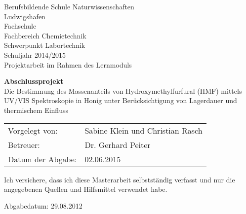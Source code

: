 \documentclass[%
11pt,                               %
liststotoc,                 %
bibtotoc,                       %
]{scrreprt}
\begin{document}
\pagestyle{empty} %
\setlength{\parindent}{0cm}

\begin{titlepage}
  \begin{center}
    \vspace*{2cm}
      \Large{Berufsbildende Schule Naturwissenschaften}\\
      \smallskip
      \Large{Ludwigshafen}\\
      \smallskip
      \Large{Fachschule}\\
      \smallskip
      \Large{Fachbereich Chemietechnik}\\
      \smallskip
      \Large{Schwerpunkt Labortechnik}\\
      \smallskip
      \Large{Schuljahr 2014/2015}\\
      \smallskip
      \Large{Projektarbeit im Rahmen des Lernmoduls}
      \smallskip
      
    \vspace{3cm}

    \vspace{0.5\baselineskip} {\Huge \textbf{Abschlussprojekt}\\\vspace{1cm} \huge Die Bestimmung des Massenanteils von Hydroxymethylfurfural (HMF) mittels UV/VIS Spektroskopie in Honig unter Berücksichtigung von Lagerdauer und thermischem Einfluss}
  \end{center}

  \vfill

  {\large
    \begin{tabular}[l]{ll}
      Vorgelegt von: & Sabine Klein und Christian Rasch\\
      Betreuer: & Dr. Gerhard Peiter\\
      Datum der Abgabe: & 02.06.2015
    \end{tabular}
  }

\end{titlepage}

\thispagestyle{empty}

\vspace*{100pt} Ich versichere, dass ich diese Masterarbeit selbstst\"andig verfasst und nur die
angegebenen Quellen und Hilfsmittel verwendet habe.

\vspace*{50pt}


Abgabedatum: 29.08.2012 \newpage

\end{document}
